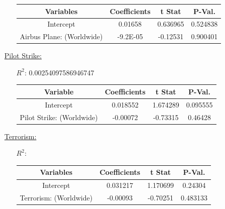 \documentclass[12pt]{report}
\begin{document}
\begin{enumerate}
\begin{enumerate}
                \begin{tabular}{|c|c|c|c|}
                    \toprule \hline
                    \textbf{Variables} & \textbf{Coefficients} & \textbf{t Stat} & \textbf{P-Val.}\\ \hline

                    Intercept & 0.01658 & 0.636965 &0.524838 \\ \hline
                    Airbus Plane: (Worldwide) & -9.2E-05 & -0.12531 &0.900401 \\ \hline
                    \bottomrule
                \end{tabular}




        \end{enumerate}
    \item[\underline{Pilot Strike:}]
        \begin{enumerate}
            \item[$R^2$:]0.00254097586946747
            \item[]


                \begin{tabular}{|c|c|c|c|}
                    \toprule \hline
                    \textbf{Variable} & \textbf{Coefficients} & \textbf{t Stat}& \textbf{P-Val.} \\ \hline

                    Intercept & 0.018552 & 1.674289& 0.095555\\ \hline
                    Pilot Strike: (Worldwide) & -0.00072 & -0.73315 &0.46428 \\ \hline
                    \bottomrule
                \end{tabular}





        \end{enumerate}
    \item[\underline{Terrorism:}]
        \begin{enumerate}
            \item[$R^2$:]
            \item[]

                \begin{tabular}{|c|c|c|c|}
                    \toprule \hline
                    \textbf{Variables} & \textbf{Coefficients} & \textbf{t Stat} &\textbf{P-Val.}\\ \hline

                    Intercept & 0.031217 & 1.170699& 0.24304\\ \hline
                    Terrorism: (Worldwide) & -0.00093 & -0.70251 &0.483133 \\ \hline
                    \bottomrule
                \end{tabular}






\end{enumerate}
\end{enumerate}
\end{document}
